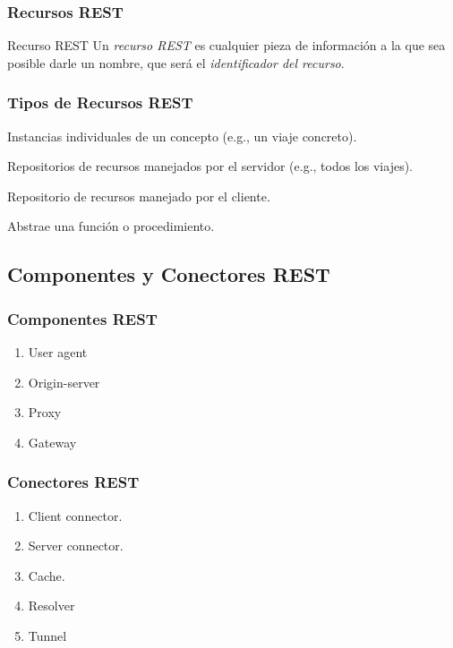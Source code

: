 \documentclass[a4paper,slidestop,blue]{beamer}
\begin{document}
\begin{frame}[c]
	\frametitle{Recursos REST}
    \begin{block}{Recurso REST}
        Un \emph{recurso REST} es cualquier pieza de información a la que sea posible darle un nombre, que será el \emph{identificador del recurso}.
    \end{block}
\end{frame}

\begin{frame}[c]
    \frametitle{Tipos de Recursos REST}
    \begin{description}[<+->]
        \item[Documentos] Instancias individuales de un concepto (e.g., un viaje concreto).
        \item[Colecciones] Repositorios de recursos manejados por el servidor (e.g., todos los viajes).
        \item[Store] Repositorio de recursos manejado por el cliente.
        \item[Controller] Abstrae una función o procedimiento.
    \end{description}
\end{frame}

\subsection{Componentes y Conectores REST}

\begin{frame}[c]
    \frametitle{Componentes REST}
    \begin{enumerate}[<+->]
        \item User agent
        \item Origin-server
        \item Proxy
        \item Gateway
    \end{enumerate}
\end{frame}

\begin{frame}[c]
    \frametitle{Conectores REST}
    \begin{enumerate}[<+->]
        \item Client connector.
        \item Server connector.
        \item Cache.
        \item Resolver
        \item Tunnel
    \end{enumerate}

\end{frame}
\end{document}
